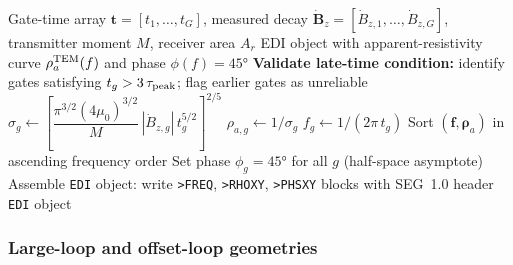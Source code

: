 \documentclass[review,12pt]{elsarticle}
\begin{document}
\begin{algorithm}[htbp]
\caption{TEM-to-frequency-domain bridge (\texttt{TEMConverter})}
\label{alg:tem2fd}
\begin{algorithmic}[1]
\Require Gate-time array $\bm{t} = [t_1, \ldots, t_G]$,
         measured decay $\dot{\bm{B}}_z = [\dot{B}_{z,1}, \ldots, \dot{B}_{z,G}]$,
         transmitter moment $M$, receiver area $A_r$
\Ensure  EDI object with apparent-resistivity curve $\rho_a^{\rm TEM}(f)$ and
         phase $\phi(f) = 45°$
\State \textbf{Validate late-time condition:} identify gates satisfying
       $t_g > 3\,\tau_{\rm peak}$; flag earlier gates as unreliable
  \State $\sigma_g \leftarrow
         \left[\dfrac{\pi^{3/2}(4\mu_0)^{3/2}}{M}
               \,|\dot{B}_{z,g}|\,t_g^{5/2}\right]^{2/5}$
  \State $\rho_{a,g} \leftarrow 1/\sigma_g$
  \State $f_g \leftarrow 1/(2\pi\,t_g)$
\EndFor
\State Sort $(\bm{f}, \bm{\rho}_a)$ in ascending frequency order
\State Set phase $\phi_g = 45°$ for all $g$ (half-space asymptote)
\State Assemble \texttt{EDI} object: write \texttt{>FREQ}, \texttt{>RHOXY},
       \texttt{>PHSXY} blocks with SEG~1.0 header
\State \Return \texttt{EDI} object
\end{algorithmic}
\end{algorithm}

\subsubsection{Large-loop and offset-loop geometries}
\label{sec:loopgeometries}
\end{document}
